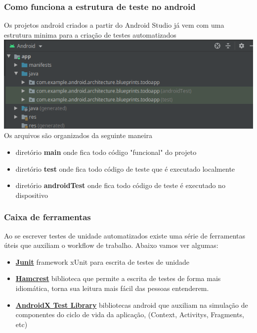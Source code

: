 \documentclass{beamer}
\begin{document}
\begin{frame}
	\frametitle{Como funciona a estrutura de teste no android}
	Os projetos android criados a partir do Android Studio já vem com uma estrutura minima para a criação de testes automatizados
	\includegraphics[scale=0.5]{test_structure_android}
	\newline Os arquivos são organizados da seguinte maneira
	\begin{itemize}
		\item diretório \textbf{main} onde fica todo código "funcional" do projeto
		\item diretório \textbf{test} onde fica todo código de teste que é executado localmente 
		\item diretório \textbf{androidTest} onde fica todo código de teste é executado no dispositivo
	\end{itemize}
	
\end{frame}

\begin{frame}
	\frametitle{Caixa de ferramentas}
	Ao se escrever testes de unidade automatizados existe uma série de ferramentas úteis que auxiliam o workflow de trabalho. Abaixo vamos ver algumas:
	\newline 
	\begin{itemize}
		\item \href{https://junit.org/junit4/}{\textbf{Junit}} framework xUnit para escrita de testes de unidade
		\item \href{http://hamcrest.org/}{\textbf{Hamcrest}} biblioteca que permite a escrita de testes de forma mais idiomática, torna sua leitura mais fácil das pessoas entenderem.
		\item \href{https://developer.android.com/training/testing/set-up-project}
		{\textbf{AndroidX Test Library}} bibliotecas android que auxiliam na simulação de componentes do ciclo de vida da aplicação, (Context, Activitys, Fragments, etc)
		

	\end{itemize}
	
\end{frame}
\end{document}
